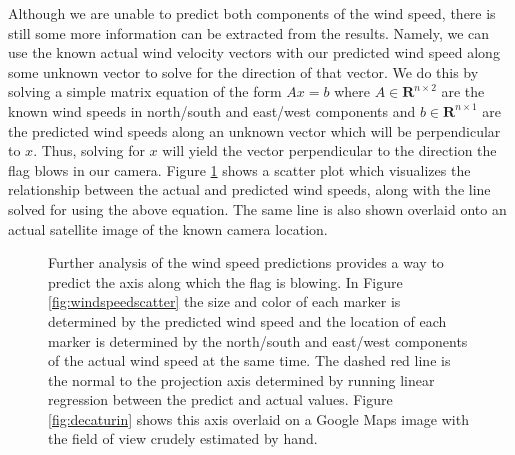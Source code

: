 Although we are unable to predict both components of the wind speed, there is still some more information can be extracted from the results. Namely, we can use the known actual wind velocity vectors with our predicted wind speed along some unknown vector to solve for the direction of that vector. We do this by solving a simple matrix equation of the form $Ax=b$ where $A \in \mathbf{R}^{n\times 2}$ are the known wind speeds in north/south and east/west components and $b \in \mathbf{R}^{n \times 1}$ are the predicted wind speeds along an unknown vector which will be perpendicular to $x$. Thus, solving for $x$ will yield the vector perpendicular to the direction the flag blows in our camera. Figure \ref{fig:winddirpred} shows a scatter plot which visualizes the relationship between the actual and predicted wind speeds, along with the line solved for using the above equation. The same line is also shown overlaid onto an actual satellite image of the known camera location.
\begin{figure}
	\centering
	\caption[Further analysis of the wind speed predictions provides a way to predict the axis along which the flag is blowing]{Further analysis of the wind speed predictions provides a way to predict the axis along which the flag is blowing. In Figure \ref{fig:windspeedscatter} the size and color of each marker is determined by the predicted wind speed and the location of each marker is determined by the north/south and east/west components of the actual wind speed at the same time. The dashed red line is the normal to the projection axis determined by running linear regression between the predict and actual values. Figure \ref{fig:decaturin} shows this axis overlaid on a Google Maps image with the field of view crudely estimated by hand.}
	\label{fig:winddirpred}
\end{figure}

